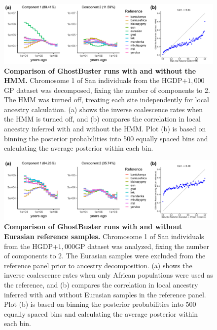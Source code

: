 \begin{figure}
    \centering
    \includegraphics[width=\textwidth]{figures/gb_deepadmix/gb_real_deep_sanity1.pdf}
    \caption{\textbf{Comparison of GhostBuster runs with and without the HMM.} Chromosome 1 of San individuals from the HGDP+$1{,}000$GP dataset was decomposed, fixing the number of components to 2. The HMM was turned off, treating each site independently for local ancestry calculation. (a) shows the inverse coalescence rates when the HMM is turned off, and (b) compares the correlation in local ancestry inferred with and without the HMM. Plot (b) is based on binning the posterior probabilities into 500 equally spaced bins and calculating the average posterior within each bin.}
    \label{fig:gb_deepadmix_sanity1}
\end{figure}

\begin{figure}
    \centering
    \includegraphics[width=\textwidth]{figures/gb_deepadmix/gb_real_deep_sanity2.pdf}
    \caption{\textbf{Comparison of GhostBuster runs with and without Eurasian reference samples.} Chromosome 1 of San individuals from the HGDP+$1{,}000$GP dataset was analyzed, fixing the number of components to 2. The Eurasian samples were excluded from the reference panel prior to ancestry decomposition. (a) shows the inverse coalescence rates when only African populations were used as the reference, and (b) compares the correlation in local ancestry inferred with and without Eurasian samples in the reference panel. Plot (b) is based on binning the posterior probabilities into 500 equally spaced bins and calculating the average posterior within each bin.}
    \label{fig:gb_deepadmix_sanity2}
\end{figure}

